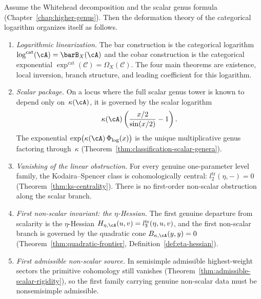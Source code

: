 \begin{theorem}
\label{thm:platonic-hierarchy-log}
Assume the Whitehead decomposition and the scalar genus formula
(Chapter~\ref{chap:higher-genus}). Then the deformation theory of the
categorical logarithm organizes itself as follows.
\begin{enumerate}[label=\textup{(\roman*)}]
\item \emph{Logarithmic linearization.} The bar construction is the
categorical logarithm
$\log^{\mathrm{cat}}(\cA) = \barB_X(\cA)$ and the cobar construction
is the categorical exponential
$\exp^{\mathrm{cat}}(\mathcal{C}) = \Omega_X(\mathcal{C})$. The four
main theorems are existence, local inversion, branch structure, and
leading coefficient for this logarithm.

\item \emph{Scalar package.} On a locus where the full scalar genus
tower is known to depend only on~$\kappa(\cA)$, it is governed by the
scalar logarithm
\[
\kappa(\cA)\left(\frac{x/2}{\sin(x/2)} - 1\right).
\]
The exponential
$\exp\bigl(\kappa(\cA)\, \Phi_{\log}(x)\bigr)$ is the unique
multiplicative genus factoring through~$\kappa$
\textup{(}Theorem~\textup{\ref{thm:classification-scalar-genera})}.

\item \emph{Vanishing of the linear obstruction.} For every genuine
one-parameter level family, the Kodaira--Spencer class is
cohomologically central:
$l_2^{\mathrm{tr}}(\eta, -) = 0$
\textup{(}Theorem~\textup{\ref{thm:ks-centrality})}. There is no
first-order non-scalar obstruction along the scalar branch.

\item \emph{First non-scalar invariant: the $\eta$-Hessian.}
The first genuine departure from scalarity is the $\eta$-Hessian
$H_{\eta,\cA}(u,v) = l_3^{\mathrm{tr}}(\eta, u, v)$, and the first
non-scalar branch is governed by the quadratic cone
$B_{\kappa,\cA}(y,y) = 0$
\textup{(}Theorem~\textup{\ref{thm:quadratic-frontier}},
Definition~\textup{\ref{def:eta-hessian})}.

\item \emph{First admissible non-scalar source.} In semisimple admissible highest-weight
sectors the primitive cohomology still vanishes
\textup{(}Theorem~\textup{\ref{thm:admissible-scalar-rigidity})}, so
the first family carrying genuine non-scalar data must be
nonsemisimple admissible.
\end{enumerate}
\end{theorem}

